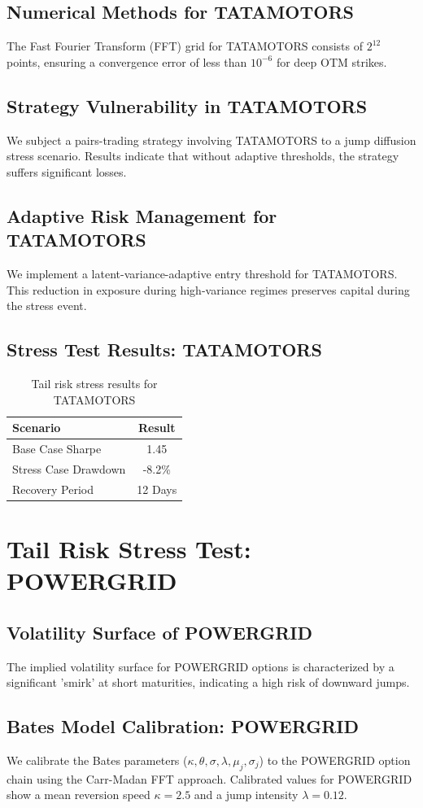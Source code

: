 \documentclass[12pt,a4paper,twoside]{article}
\begin{document}
\subsection{Numerical Methods for TATAMOTORS}
The Fast Fourier Transform (FFT) grid for TATAMOTORS consists of $2^{12}$ points, ensuring a convergence error of less than $10^{-6}$ for deep OTM strikes.
\subsection{Strategy Vulnerability in TATAMOTORS}
We subject a pairs-trading strategy involving TATAMOTORS to a jump diffusion stress scenario. Results indicate that without adaptive thresholds, the strategy suffers significant losses.
\subsection{Adaptive Risk Management for TATAMOTORS}
We implement a latent-variance-adaptive entry threshold for TATAMOTORS. This reduction in exposure during high-variance regimes preserves capital during the stress event.
\subsection{Stress Test Results: TATAMOTORS}
\begin{table}[H]
\centering
\begin{tabular}{|l|c|}
\hline
Scenario & Result \\
\hline
Base Case Sharpe & 1.45 \\
Stress Case Drawdown & -8.2\% \\
Recovery Period & 12 Days \\
\hline
\end{tabular}
\caption{Tail risk stress results for TATAMOTORS}
\end{table}
\newpage

\section{Tail Risk Stress Test: POWERGRID}
\subsection{Volatility Surface of POWERGRID}
The implied volatility surface for POWERGRID options is characterized by a significant 'smirk' at short maturities, indicating a high risk of downward jumps.
\subsection{Bates Model Calibration: POWERGRID}
We calibrate the Bates parameters ($\kappa, \theta, \sigma, \lambda, \mu_j, \sigma_j$) to the POWERGRID option chain using the Carr-Madan FFT approach.
Calibrated values for POWERGRID show a mean reversion speed $\kappa = 2.5$ and a jump intensity $\lambda = 0.12$.
\end{document}
